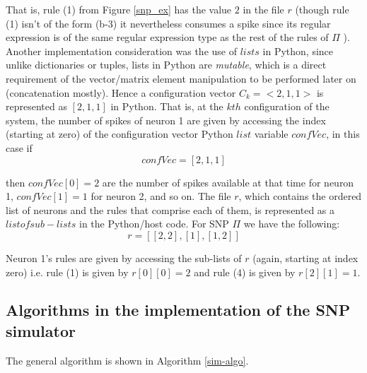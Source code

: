 \documentclass{acm_proc_article-sp}
\begin{document}
That is, rule (1) from Figure \ref{snp_ex} has the value $2$ in the file $r$ (though rule (1)
isn't of the form (b-3) it nevertheless consumes a spike since
its regular expression is of the same regular expression type
as the rest of the rules of ${\Pi}$ ). Another implementation
consideration was the use of $lists$ in Python, since unlike
dictionaries or tuples, lists in Python are  \emph{mutable}, which is a
direct requirement of the vector/matrix element
manipulation to be performed later on (concatenation
mostly). Hence a configuration vector $C_k = <2, 1, 1>$ is
represented as $[ 2, 1, 1 ]$ in Python. That is, at the $kth$
configuration of the system, the number of spikes of neuron
1 are given by accessing the index (starting at zero) of the
configuration vector Python $list$ variable $confVec$, in this case if
\begin{equation}\label{confvec}
confVec = [ 2, 1, 1 ]
\end{equation}
	
then $confVec[ 0 ] = 2$ are the number of spikes available at
that time for neuron 1, $confVec[ 1 ] = 1$ for neuron 2, and so
on. The file $r$, which contains the ordered list of neurons and
the rules that comprise each of them, is represented as a $list of sub-
lists$ in the Python/host code. For SNP ${\Pi}$ we have the
following:
\begin{equation}\label{rule-list}
r = [ [ 2, 2 ], [ 1 ], [ 1, 2 ] ]
\end{equation}

Neuron 1's rules are given by accessing the sub-lists of $r$
(again, starting at index zero) i.e. rule (1) is given by $r[ 0 ][ 0 ]
= 2$ and rule (4) is given by $r[ 2 ][ 1 ] = 1$.

\subsection{Algorithms in the implementation of the SNP
simulator}\label{snp-sim-algo}
	
The general algorithm is shown in Algorithm \ref{sim-algo}.
	
\end{document}

